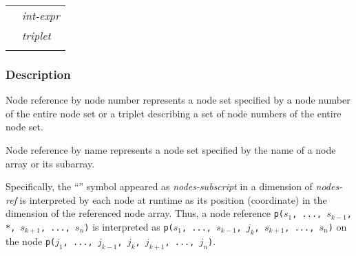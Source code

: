 \hspace{\hsize}

\begin{tabular}{ll}
 \hspace{0.5cm} & {\it int-expr} \\
 \hspace{0.5cm} & {\it triplet} \\
 \hspace{0.5cm} & {\tt *} \\
\end{tabular}


\subsubsection*{Description}

Node reference by node number represents a node set specified by a
node number of the entire node set or a triplet describing a set of node
numbers of the entire node set.

Node reference by name represents a node set specified by the name of a
node array or its subarray.


Specifically, the ``{\tt *}'' symbol appeared as {\it nodes-subscript}
in a dimension of {\it nodes-ref} is interpreted by each node at runtime
as its position (coordinate) in the dimension of the referenced node
array.
%
Thus, a node reference {\tt p($s_1$, ..., $s_{k-1}$, *, $s_{k+1}$, ...,
$s_n$)} is interpreted as {\tt p($s_1$, ..., $s_{k-1}$, $j_k$,
$s_{k+1}$, ..., $s_n$)} on the node {\tt p($j_1$, ..., $j_{k-1}$, $j_k$,
$j_{k+1}$, ..., $j_n$)}.

